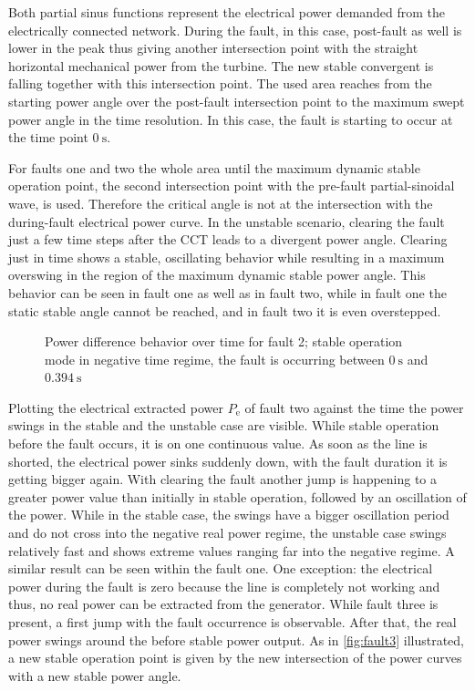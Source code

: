 Both partial sinus functions represent the electrical power demanded from the electrically connected network. During the fault, in this case, post-fault as well is lower in the peak thus giving another intersection point with the straight horizontal mechanical power from the turbine. The new stable convergent is falling together with this intersection point. The used area reaches from the starting power angle over the post-fault intersection point to the maximum swept power angle in the time resolution. In this case, the fault is starting to occur at the time point $0~\mathrm{s}$.

For faults one and two the whole area until the maximum dynamic stable operation point, the second intersection point with the pre-fault partial-sinoidal wave, is used. Therefore the critical angle is not at the intersection with the during-fault electrical power curve. In the unstable scenario, clearing the fault just a few time steps after the \acs{CCT} leads to a divergent power angle. Clearing just in time shows a stable, oscillating behavior while resulting in a maximum overswing in the region of the maximum dynamic stable power angle. This behavior can be seen in fault one as well as in fault two, while in fault one the static stable angle cannot be reached, and in fault two it is even overstepped.

\begin{figure}[H]
        \centering
        
        \caption[Power difference behavior over time for fault 2]{Power difference behavior over time for fault 2; stable operation mode in negative time regime, the fault is occurring between $0~\mathrm{s}$ and $0.394~\mathrm{s}$}
        \label{fig:pd-fault2}
\end{figure}

Plotting the electrical extracted power $P_\mathrm{e}$ of fault two against the time the power swings in the stable and the unstable case are visible. While stable operation before the fault occurs, it is on one continuous value. As soon as the line is shorted, the electrical power sinks suddenly down, with the fault duration it is getting bigger again. With clearing the fault another jump is happening to a greater power value than initially in stable operation, followed by an oscillation of the power. While in the stable case, the swings have a bigger oscillation period and do not cross into the negative real power regime, the unstable case swings relatively fast and shows extreme values ranging far into the negative regime. A similar result can be seen within the fault one. One exception: the electrical power during the fault is zero because the line is completely not working and thus, no real power can be extracted from the generator. While fault three is present, a first jump with the fault occurrence is observable. After that, the real power swings around the before stable power output. As in \autoref{fig:fault3} illustrated, a new stable operation point is given by the new intersection of the power curves with a new stable power angle.

